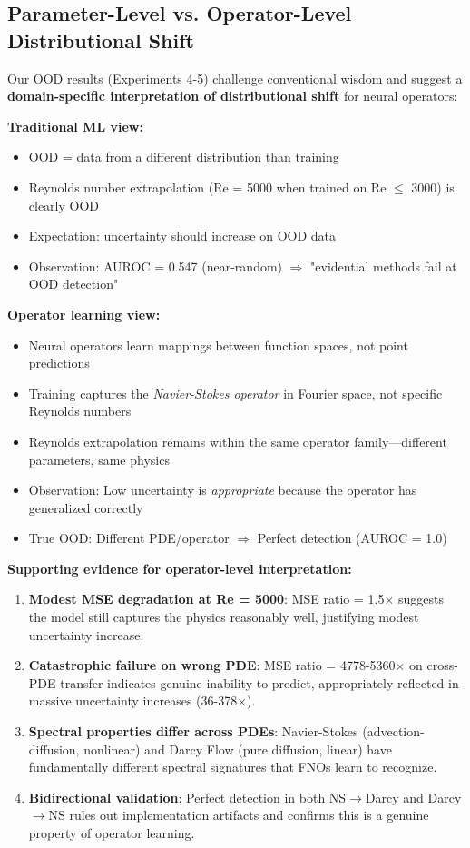 \subsection{Parameter-Level vs. Operator-Level Distributional Shift}

Our OOD results (Experiments 4-5) challenge conventional wisdom and suggest a \textbf{domain-specific interpretation of distributional shift} for neural operators:

\textbf{Traditional ML view:}
\begin{itemize}
\item OOD = data from a different distribution than training
\item Reynolds number extrapolation (Re = 5000 when trained on Re $\leq$ 3000) is clearly OOD
\item Expectation: uncertainty should increase on OOD data
\item Observation: AUROC = 0.547 (near-random) $\Rightarrow$ "evidential methods fail at OOD detection"
\end{itemize}

\textbf{Operator learning view:}
\begin{itemize}
\item Neural operators learn mappings between function spaces, not point predictions
\item Training captures the \textit{Navier-Stokes operator} in Fourier space, not specific Reynolds numbers
\item Reynolds extrapolation remains within the same operator family—different parameters, same physics
\item Observation: Low uncertainty is \textit{appropriate} because the operator has generalized correctly
\item True OOD: Different PDE/operator $\Rightarrow$ Perfect detection (AUROC = 1.0)
\end{itemize}

\textbf{Supporting evidence for operator-level interpretation:}

\begin{enumerate}
\item \textbf{Modest MSE degradation at Re = 5000}: MSE ratio = 1.5× suggests the model still captures the physics reasonably well, justifying modest uncertainty increase.

\item \textbf{Catastrophic failure on wrong PDE}: MSE ratio = 4778-5360× on cross-PDE transfer indicates genuine inability to predict, appropriately reflected in massive uncertainty increases (36-378×).

\item \textbf{Spectral properties differ across PDEs}: Navier-Stokes (advection-diffusion, nonlinear) and Darcy Flow (pure diffusion, linear) have fundamentally different spectral signatures that FNOs learn to recognize.

\item \textbf{Bidirectional validation}: Perfect detection in both NS$\to$Darcy and Darcy$\to$NS rules out implementation artifacts and confirms this is a genuine property of operator learning.
\end{enumerate}

